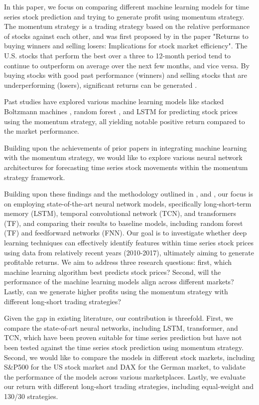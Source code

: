 \documentclass{article}
\begin{document}
In this paper, we focus on comparing different machine learning models for time series stock prediction and trying to generate profit using momentum strategy. The momentum strategy is a trading strategy based on the relative performance of stocks against each other, and was first proposed by \cite{jegadeesh1993returns} in the paper "Returns to buying winners and selling losers: Implications for stock market efficiency". The U.S. stocks that perform the best over a three to 12-month period tend to continue to outperform on average over the next few months, and vice versa. By buying stocks with good past performance (winners) and selling stocks that are underperforming (losers), significant returns can be generated \citep{takeuchi2013applying, krauss2017deep, fischer2018deep}.

Past studies have explored various machine learning models like stacked Boltzmann machines \citep{takeuchi2013applying}, random forest \citep{krauss2017deep, zhang2022statistical}, and LSTM \citep{fischer2018deep, fjellstrom2022long} for predicting stock prices using the momentum strategy, all yielding notable positive return compared to the market performance. 

Building upon the achievements of prior papers in integrating machine learning with the momentum strategy, we would like to explore various neural network architectures for forecasting time series stock movements within the momentum strategy framework.

Building upon these findings and the methodology outlined in \cite{krauss2017deep}, \cite{fischer2018deep} and \cite{takeuchi2013applying}, our focus is on employing state-of-the-art neural network models, specifically long-short-term memory (LSTM), temporal convolutional network (TCN), and transformers (TF), and comparing their results to baseline models, including random forest (TF) and feedforward networks (FNN). Our goal is to investigate whether deep learning techniques can effectively identify features within time series stock prices using data from relatively recent years (2010-2017), ultimately aiming to generate profitable returns. We aim to address three research questions: first, which machine learning algorithm best predicts stock prices? Second, will the performance of the machine learning models align across different markets? Lastly, can we generate higher profits using the momentum strategy with different long-short trading strategies?

Given the gap in existing literature, our contribution is threefold. First, we compare the state-of-art neural networks, including LSTM, transformer, and TCN, which have been proven suitable for time series prediction but have not been tested against the time series stock prediction using momentum strategy. Second, we would like to compare the models in different stock markets, including S\&P500 for the US stock market and DAX for the German market, to validate the performance of the models across various marketplaces. Lastly, we evaluate our return with different long-short trading strategies, including equal-weight and 130/30 strategies. 
\end{document}

